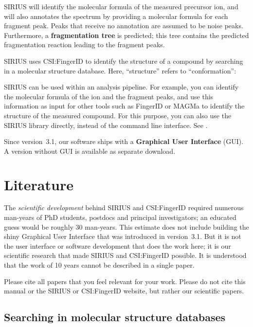 \documentclass[letterpaper,10pt,openany,oneside]{sphinxmanual}
\begin{document}
SIRIUS will identify the molecular formula of the measured precursor ion,
and will also annotates the spectrum by providing a molecular formula for
each fragment peak.  Peaks that receive no annotation are assumed to be noise
peaks.  Furthermore, a \textbf{fragmentation tree} is predicted; this tree
contains the predicted fragmentation reaction leading to the fragment peaks.

SIRIUS uses CSI:FingerID to identify the structure of a compound by
searching in a molecular structure database.  Here, ``structure'' refers to
``conformation'': 

SIRIUS can be used within an analysis pipeline. For example, you can
identify the molecular formula of the ion and the fragment peaks, and use
this information as input for other tools such as FingerID or MAGMa to
identify the structure of the measured compound. For this purpose, you can
also use the SIRIUS library directly, instead of the command line
interface. See {\hyperref[library::doc]{}}.

Since version~3.1, our software ships with a \textbf{Graphical User
Interface} (GUI).  A version without GUI is available as separate download.

\clearpage


\section{Literature}
\label{introduction:literature}

The \emph{scientific development} behind SIRIUS and CSI:FingerID required
numerous man-years of PhD students, postdocs and principal investigators; an
educated guess would be roughly 30 man-years.  This estimate does not include
building the shiny Graphical User Interface that was introduced in
version~3.1.  But it is not the user interface or software development that
does the work here; it is our scientific research that made SIRIUS and
CSI:FingerID possible.  It is understood that the work of 10 years cannot be
described in a single paper.

Please cite all papers that you feel relevant for your work.  Please do not
cite this manual or the SIRIUS or CSI:FingerID website, but rather our
scientific papers.

\subsection{Searching in molecular structure databases}
\label{introduction:searching-in-molecular-structure-databases}
\end{document}
